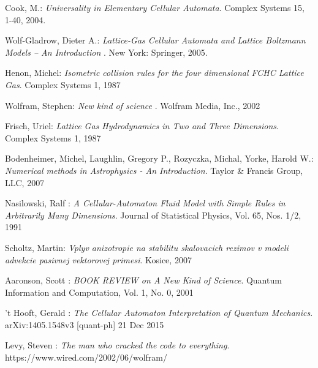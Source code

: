\documentclass[12pt,a4paper,fleqn]{report}
\begin{document}
\begin{thebibliography}{99}
 
{\sc Cook,} M.:
\emph{Universality in Elementary Cellular Automata}. 
Complex Systems 15, 1-40, 2004. 
 
   {\sc Wolf-Gladrow,} Dieter A.:
   \emph{ Lattice-Gas Cellular Automata and Lattice Boltzmann Models -- An Introduction }.
   New York: Springer, 2005.

   {\sc Henon,} Michel:
   \emph{ Isometric collision rules for the four dimensional FCHC Lattice Gas}.
   Complex Systems 1, 1987

   {\sc Wolfram,} Stephen:
   \emph{ New kind of science }.
   Wolfram Media, Inc., 2002

   {\sc Frisch,} Uriel:
   \emph{ Lattice Gas Hydrodynamics in Two and Three Dimensions}.
   Complex Systems 1, 1987

   {\sc Bodenheimer,} Michel, {\sc Laughlin,} Gregory P., {\sc Rozyczka,} Michal, {\sc Yorke,} Harold W.:
   \emph{ Numerical methods in Astrophysics - An Introduction}.
   Taylor \& Francis Group, LLC, 2007


   {\sc Nasilowski,} Ralf :
   \emph{ A Cellular-Automaton Fluid Model with Simple Rules in Arbitrarily Many Dimensions}.
   Journal of Statistical Physics, Vol. 65, Nos. 1/2, 1991

   {\sc Scholtz,} Martin:
   \emph{ Vplyv anizotropie na stabilitu skalovacich
rezimov v modeli advekcie pasivnej
vektorovej primesi}.
   Kosice, 2007
   

   {\sc Aaronson,} Scott :
   \emph{ BOOK REVIEW on A New Kind of Science}.
	Quantum Information and Computation, Vol. 1, No. 0, 2001


   {\sc 't Hooft,} Gerald :
   \emph{ The Cellular Automaton Interpretation of Quantum Mechanics}.
	arXiv:1405.1548v3 [quant-ph] 21 Dec 2015

   {\sc Levy,} Steven :
   \emph{ The man who cracked the code to everything}.
	https://www.wired.com/2002/06/wolfram/



\end{thebibliography}

\listoffigures

\listoftables
\end{document}
